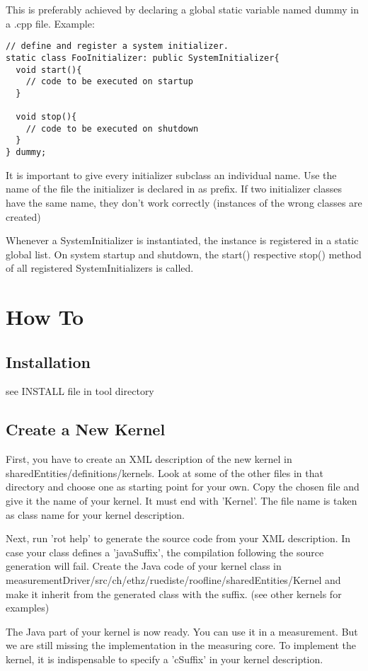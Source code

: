 \documentclass[a4paper,12pt]{article}
\begin{document}
This is preferably achieved by declaring a global static variable named dummy
in a .cpp file. Example:
\begin{verbatim}
// define and register a system initializer.
static class FooInitializer: public SystemInitializer{
  void start(){
    // code to be executed on startup
  }

  void stop(){
    // code to be executed on shutdown
  }
} dummy;
\end{verbatim}

It is important to give every initializer subclass an individual name. Use the
name of the file the initializer is declared in as prefix. If two initializer
classes have the same name, they don't work correctly (instances of the wrong
classes are created)

Whenever a SystemInitializer is instantiated, the instance is registered in a
static global list. On system startup and shutdown, the start() respective
stop() method of all registered SystemInitializers is called.

\section{How To}
\subsection{Installation}
see INSTALL file in tool directory

\subsection{Create a New Kernel}
First, you have to create an XML description of the new kernel in
sharedEntities/definitions/kernels. Look at some of the other files in that
directory and choose one as starting point for your own. Copy the chosen file
and give it the name of your kernel. It must end with 'Kernel'. The file name is
taken as class name for your kernel description.

Next, run 'rot help' to generate the source code from your XML description. In
case your class defines a 'javaSuffix', the compilation following the source
generation will fail. Create the Java code of your kernel class in
measurementDriver/src/ch/ethz/ruediste/roofline/sharedEntities/Kernel and make
it inherit from the generated class with the suffix. (see other kernels for
examples)

The Java part of your kernel is now ready. You can use it in a measurement. But
we are still missing the implementation in the measuring core. To implement the
kernel, it is indispensable to specify a 'cSuffix' in your kernel description.
\end{document}
